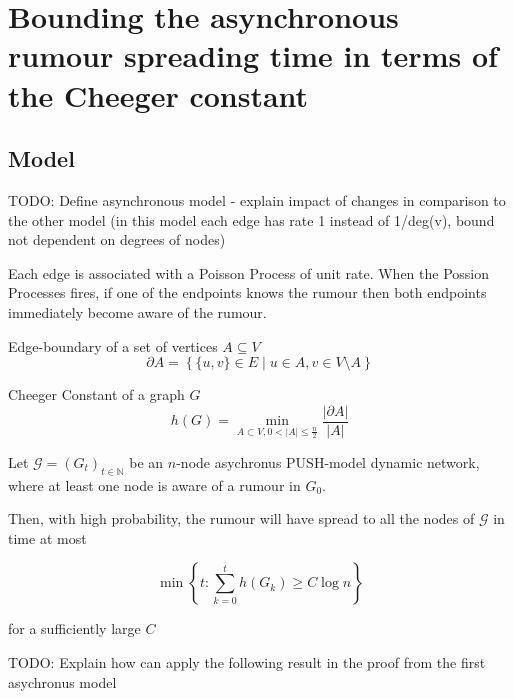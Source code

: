 \section{Bounding the asynchronous rumour spreading time in terms of the Cheeger constant}
\label{AsyncCheegerBound}

\subsection{Model}

TODO: Define asynchronous model - explain impact of changes in comparison to the other model (in this model each edge has rate 1 instead of 1/deg(v), bound not dependent on degrees of nodes)


Each edge is associated with a Poisson Process of unit rate. When the Possion Processes fires, if one of the endpoints knows the rumour then both endpoints immediately become aware of the rumour. 

\begin{definition}
	Edge-boundary of a set of vertices $A \subseteq V$
	$$
		\partial A = \left\{ \{u, v\} \in E \mid u \in A, v \in V \setminus A \right\} 
	$$
\end{definition}

\begin{definition}
	Cheeger Constant of a graph $G$
	$$
		h(G) = \min_{A \subset V, 0 < |A| \leq \frac{n}{2}} \frac{|\partial A|}{|A|}
	$$

\end{definition}

\begin{theorem}
	Let $\mathcal{G} = (G_t)_{t \in \mathbb{N}}$ be an $n$-node asychronus PUSH-model dynamic network, where at least one node is aware of a rumour in $G_0$.

	Then, with high probability, the rumour will have spread to all the nodes of $\mathcal{G}$ in time at most

	$$
		\min \left\{t : \sum_{k=0}^t h(G_k) \geq C \log n \right\} 
	$$

	\noindent
	for a sufficiently large $C$
\end{theorem}

TODO: Explain how can apply the following result in the proof from the first asychronus model

